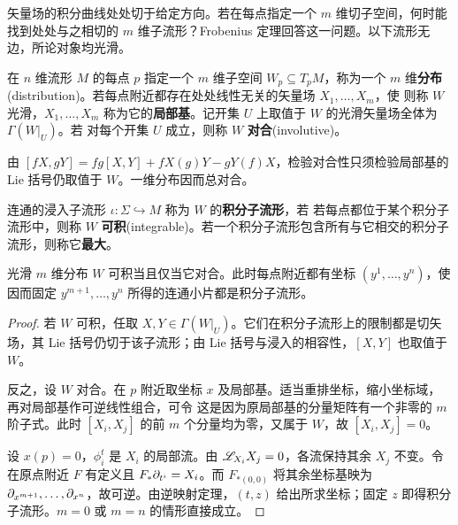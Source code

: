 矢量场的积分曲线处处切于给定方向。若在每点指定一个 $m$ 维切子空间，何时能找到处处与之相切的 $m$ 维子流形？Frobenius 定理回答这一问题。以下流形无边，所论对象均光滑。

\begin{definition}
    在 $n$ 维流形 $M$ 的每点 $p$ 指定一个 $m$ 维子空间 $W_p\subseteq T_pM$，称为一个 $m$ 维\textbf{分布}(distribution)。若每点附近都存在处处线性无关的矢量场 $X_1,\ldots,X_m$，使
    则称 $W$ 光滑，$X_1,\ldots,X_m$ 称为它的\textbf{局部基}。记开集 $U$ 上取值于 $W$ 的光滑矢量场全体为 $\Gamma(W|_U)$。若
    对每个开集 $U$ 成立，则称 $W$ \textbf{对合}(involutive)。
\end{definition}

由 $[fX,gY]=fg[X,Y]+fX(g)Y-gY(f)X$，检验对合性只须检验局部基的 Lie 括号仍取值于 $W$。一维分布因而总对合。

\begin{definition}
    连通的浸入子流形 $\iota:\Sigma\hookrightarrow M$ 称为 $W$ 的\textbf{积分子流形}，若
    若每点都位于某个积分子流形中，则称 $W$ \textbf{可积}(integrable)。若一个积分子流形包含所有与它相交的积分子流形，则称它\textbf{最大}。
\end{definition}

\begin{theorem}
    光滑 $m$ 维分布 $W$ 可积当且仅当它对合。此时每点附近都有坐标 $(y^1,\ldots,y^n)$，使
    因而固定 $y^{m+1},\ldots,y^n$ 所得的连通小片都是积分子流形。
\end{theorem}
\begin{proof}
    若 $W$ 可积，任取 $X,Y\in\Gamma(W|_U)$。它们在积分子流形上的限制都是切矢场，其 Lie 括号仍切于该子流形；由 Lie 括号与浸入的相容性，$[X,Y]$ 也取值于 $W$。

    反之，设 $W$ 对合。在 $p$ 附近取坐标 $x$ 及局部基。适当重排坐标，缩小坐标域，再对局部基作可逆线性组合，可令
    这是因为原局部基的分量矩阵有一个非零的 $m$ 阶子式。此时 $[X_i,X_j]$ 的前 $m$ 个分量均为零，又属于 $W$，故 $[X_i,X_j]=0$。

    设 $x(p)=0$，$\phi_i^t$ 是 $X_i$ 的局部流。由 $\mathscr{L}_{X_i}X_j=0$，各流保持其余 $X_j$ 不变。令
    在原点附近 $F$ 有定义且 $F_*\partial_{t^i}=X_i$。而 $F_{*(0,0)}$ 将其余坐标基映为 $\partial_{x^{m+1}},\ldots,\partial_{x^n}$，故可逆。由逆映射定理，$(t,z)$ 给出所求坐标；固定 $z$ 即得积分子流形。$m=0$ 或 $m=n$ 的情形直接成立。
\end{proof}

